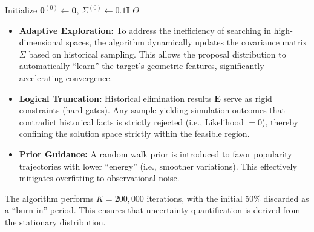 \documentclass{mcmthesis}
\begin{document}
\begin{algorithm}[H]
	\small
	\SetAlgoLined
	\DontPrintSemicolon
	\caption{Adaptive Constrained Metropolis-Hastings (ACMH)}
	\label{alg:acmh}
	
	
	Initialize $\boldsymbol{\theta}^{(0)} \leftarrow \mathbf{0}$, $\Sigma^{(0)} \leftarrow 0.1 \mathbf{I}$\;
	\Return $\Theta$\;
\end{algorithm}



\vspace{-0.4cm}
\begin{itemize}
	\item \textbf{Adaptive Exploration:} To address the inefficiency of searching in high-dimensional spaces, the algorithm dynamically updates the covariance matrix $\Sigma$ based on historical sampling. This allows the proposal distribution to automatically ``learn'' the target's geometric features, significantly accelerating convergence.
	
	\item \textbf{Logical Truncation:} Historical elimination results $\mathbf{E}$ serve as rigid constraints (hard gates). Any sample yielding simulation outcomes that contradict historical facts is strictly rejected (i.e., Likelihood $= 0$), thereby confining the solution space strictly within the feasible region.
	
	\item \textbf{Prior Guidance:} A random walk prior is introduced to favor popularity trajectories with lower ``energy'' (i.e., smoother variations). This effectively mitigates overfitting to observational noise.
\end{itemize}
\vspace{-0.4cm}
\noindent The algorithm performs $K = 200,000$ iterations, with the initial 50\% discarded as a ``burn-in'' period. This ensures that uncertainty quantification is derived from the stationary distribution.
\end{document}
